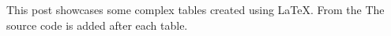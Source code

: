 This post showcases some complex tables created using LaTeX. From the The source code is added after each table.

\newline